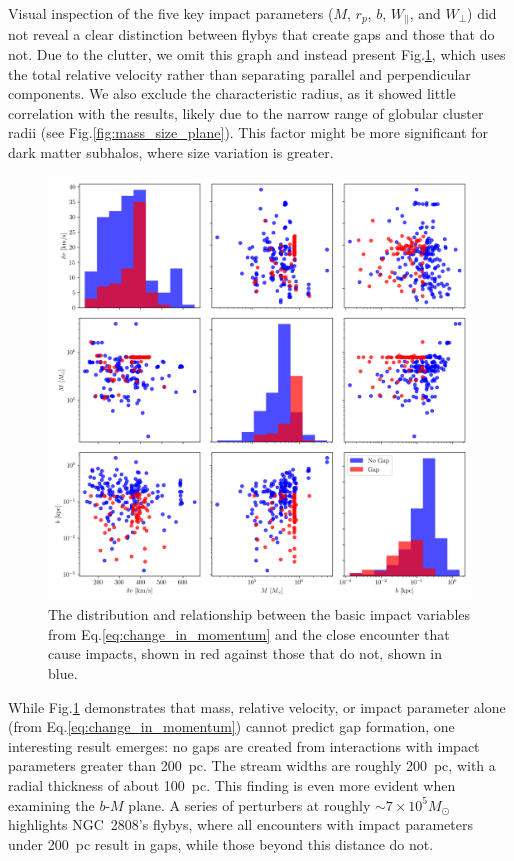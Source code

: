\documentclass[draft]{aa}
\begin{document}
\begin{appendix}
      Visual inspection of the five key impact parameters ($M$, $r_p$, $b$, $W_\parallel$, and $W_\perp$) did not reveal a clear distinction between flybys that create gaps and those that do not. Due to the clutter, we omit this graph and instead present Fig.\ref{fig:impact_geometry_statistics}, which uses the total relative velocity rather than separating parallel and perpendicular components. We also exclude the characteristic radius, as it showed little correlation with the results, likely due to the narrow range of globular cluster radii (see Fig.\ref{fig:mass_size_plane}). This factor might be more significant for dark matter subhalos, where size variation is greater.
      
      
      \begin{figure}
        \centering
        \includegraphics[width=\linewidth]{impact_geometry_statistics.png}
        \caption{The distribution and relationship between the basic impact variables from Eq.\ref{eq:change_in_momentum} and the close encounter that cause impacts, shown in red against those that do not, shown in blue. }
        \label{fig:impact_geometry_statistics}    
        \end{figure}

      While Fig.\ref{fig:impact_geometry_statistics} demonstrates that mass, relative velocity, or impact parameter alone (from Eq.\ref{eq:change_in_momentum}) cannot predict gap formation, one interesting result emerges: no gaps are created from interactions with impact parameters greater than 200~pc. The stream widths are roughly 200~pc, with a radial thickness of about 100~pc. This finding is even more evident when examining the $b$-$M$ plane. A series of perturbers at roughly $\sim7 \times 10^5 M_\odot$ highlights NGC~2808's flybys, where all encounters with impact parameters under 200~pc result in gaps, while those beyond this distance do not.
        

\end{appendix}
\end{document}
